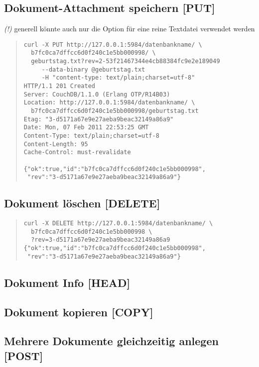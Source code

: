 \documentclass[19pt,landscape,twocolumn]{article}
\newcommand{\mono}[1]{\texttt{\textendash\textendash {#1}}}
\newcommand{\htmlverb}[1]{{[}\textbf{{#1}}{]}}
\begin{document}
\subsection{Dokument-Attachment speichern \htmlverb{PUT}}
\emph{(!)} generell könnte auch nur die Option \mono{data} für eine reine Textdatei verwendet werden
\begin{quote}
\begin{verbatim}
curl -X PUT http://127.0.0.1:5984/datenbankname/ \
  b7fc0ca7dffcc6d0f240c1e5bb000998/ \
  geburtstag.txt?rev=2-53f21467344e4cb88384fc9e2e189049
     --data-binary @geburtstag.txt
     -H "content-type: text/plain;charset=utf-8"
HTTP/1.1 201 Created
Server: CouchDB/1.1.0 (Erlang OTP/R14B03)
Location: http://127.0.0.1:5984/datenbankname/ \
  b7fc0ca7dffcc6d0f240c1e5bb000998/geburtstag.txt
Etag: "3-d5171a67e9e27aeba9beac32149a86a9"
Date: Mon, 07 Feb 2011 22:53:25 GMT
Content-Type: text/plain;charset=utf-8
Content-Length: 95
Cache-Control: must-revalidate

{"ok":true,"id":"b7fc0ca7dffcc6d0f240c1e5bb000998",
 "rev":"3-d5171a67e9e27aeba9beac32149a86a9"}
\end{verbatim}
\end{quote}

\subsection{Dokument löschen \htmlverb{DELETE}}
\begin{quote}
\begin{verbatim}
curl -X DELETE http://127.0.0.1:5984/datenbankname/ \
  b7fc0ca7dffcc6d0f240c1e5bb000998 \
  ?rev=3-d5171a67e9e27aeba9beac32149a86a9
{"ok":true,"id":"b7fc0ca7dffcc6d0f240c1e5bb000998",
 "rev":"3-d5171a67e9e27aeba9beac32149a86a9"}
\end{verbatim}
\end{quote}

\subsection{Dokument Info \htmlverb{HEAD}}

\subsection{Dokument kopieren \htmlverb{COPY}}

\subsection{Mehrere Dokumente gleichzeitig anlegen \htmlverb{POST}}
\end{document}
